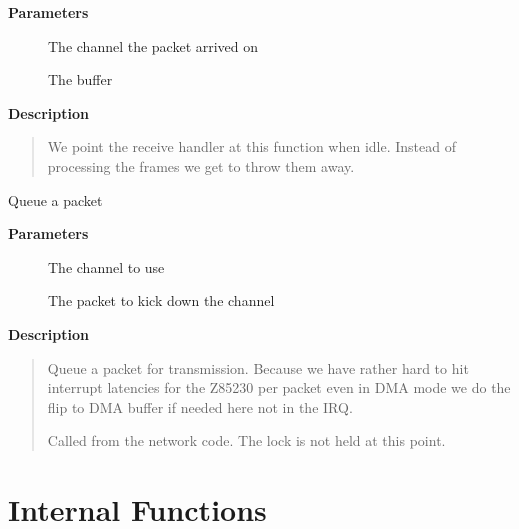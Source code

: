 \documentclass[a4paper,8pt,english]{sphinxmanual}
\begin{document}
\textbf{Parameters}
\begin{description}
\item[{}] \leavevmode
The channel the packet arrived on

\item[{}] \leavevmode
The buffer

\end{description}

\textbf{Description}
\begin{quote}

We point the receive handler at this function when idle. Instead
of processing the frames we get to throw them away.
\end{quote}

\begin{fulllineitems}
\label{networking/z8530book:c.z8530_queue_xmit}
Queue a packet

\end{fulllineitems}


\textbf{Parameters}
\begin{description}
\item[{}] \leavevmode
The channel to use

\item[{}] \leavevmode
The packet to kick down the channel

\end{description}

\textbf{Description}
\begin{quote}

Queue a packet for transmission. Because we have rather
hard to hit interrupt latencies for the Z85230 per packet
even in DMA mode we do the flip to DMA buffer if needed here
not in the IRQ.

Called from the network code. The lock is not held at this
point.
\end{quote}


\section{Internal Functions}
\label{networking/z8530book:internal-functions}
\end{document}
